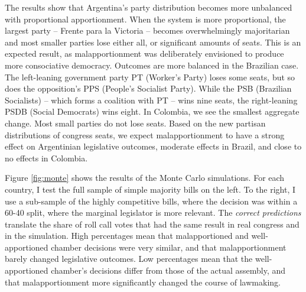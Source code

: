 \documentclass[a4paper,12pt]{article}
\begin{document}
The results show that Argentina's party distribution becomes more unbalanced with proportional apportionment. When the system is more proportional, the largest party -- Frente para la Victoria -- becomes overwhelmingly majoritarian and most smaller parties lose either all, or significant amounts of seats. This is an expected result, as malapportionment was deliberately envisioned to produce more consociative democracy. Outcomes are more balanced in the Brazilian case. The left-leaning government party PT (Worker's Party) loses some seats, but so does the opposition's PPS (People's Socialist Party). While the PSB (Brazilian Socialists) -- which forms a coalition with PT -- wins nine seats, the right-leaning PSDB (Social Democrats) wins eight. In Colombia, we see the smallest aggregate change. Most small parties do not lose seats. Based on the new partisan distributions of congress seats, we expect malapportionment to have a strong effect on Argentinian legislative outcomes, moderate effects in Brazil, and close to no effects in Colombia.

Figure \ref{fig:monte} shows the results of the Monte Carlo simulations. For each country, I test the full sample of simple majority bills on the left. To the right, I use a sub-sample of the highly competitive bills, where the decision was within a 60-40 split, where the marginal legislator is more relevant. The \textit{correct predictions} translate the share of roll call votes that had the same result in real congress and in the simulation. High percentages mean that malapportioned and well-apportioned chamber decisions were very similar, and that malapportionment barely changed legislative outcomes. Low percentages mean that the well-apportioned chamber's decisions differ from those of the actual assembly, and that malapportionment more significantly changed the course of lawmaking. 

\end{document}
